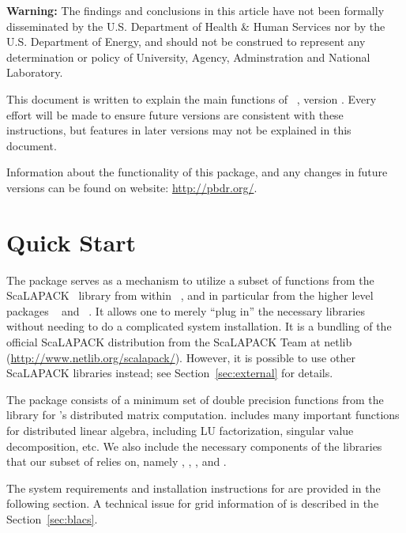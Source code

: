 {\color{red} \bf Warning:}
The findings and conclusions in this article have not been
formally disseminated by the U.S. Department of Health \& Human Services
nor by the U.S. Department of Energy,
and should not be construed to represent any determination or
policy of University, Agency, Adminstration and National Laboratory.

This document is written to explain the main
functions of ~\citep{Chen2012pbdSLAPpackage}, version \slapversion.
Every effort will be made to ensure future versions are consistent with
these instructions, but features in later versions may not be explained
in this document.

Information about the functionality of this package,
and any changes in future versions can be found on website:
\url{http://pbdr.org/}.



\section[Quick Start]{Quick Start}
\label{sec:quick_start}

The  package serves as a mechanism to utilize a subset of
functions from the ScaLAPACK~\citep{ScaLAPACK1997} library from within
~\citep{Rcore}, and in particular from the higher level
 packages ~\citep{Schmidt2012pbdBASEpackage} and
~\citep{Schmidt2012pbdDMATpackage}. It allows one to merely
``plug in'' the necessary libraries without needing to do a complicated
system installation.  It is a bundling of the official ScaLAPACK distribution
from the ScaLAPACK Team at netlib (\url{http://www.netlib.org/scalapack/}).
However, it is possible to use other ScaLAPACK libraries instead; see
Section~\ref{sec:external} for details.

The  package consists of a minimum set of double precision
functions from the  library
for 's distributed matrix computation. 
includes many important functions for distributed linear algebra, including
LU factorization, singular value decomposition, etc.
We also include the necessary components of the libraries that our subset of
 relies on, namely ,
, , and .  

The system requirements and installation instructions for  are
provided in the following section.
A technical issue for grid information of  is described in
the Section~\ref{sec:blacs}.


